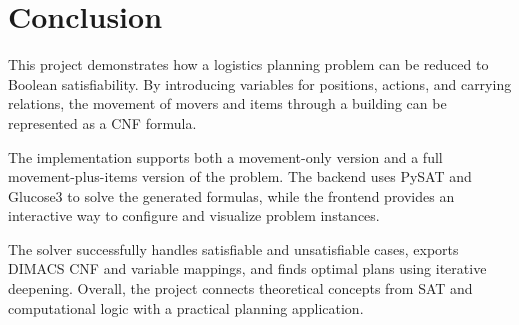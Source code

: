 \section{Conclusion} \label{sec:conclusion}
This project demonstrates how a logistics planning problem can be reduced to Boolean satisfiability.
By introducing variables for positions, actions, and carrying relations, the movement of movers and items through a building can be represented as a CNF formula.

\noindent The implementation supports both a movement-only version and a full movement-plus-items version of the problem.
The backend uses PySAT and Glucose3 to solve the generated formulas, while the frontend provides an interactive way to configure and visualize problem instances.

\noindent The solver successfully handles satisfiable and unsatisfiable cases, exports DIMACS CNF and variable mappings, and finds optimal plans using iterative deepening.
Overall, the project connects theoretical concepts from SAT and computational logic with a practical planning application.